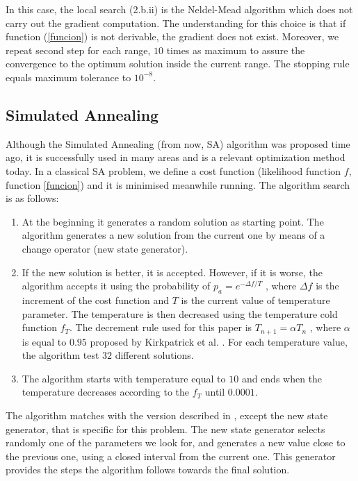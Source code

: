 \documentclass{sig-alternate}
\begin{document}
In this case, the local search (2.b.ii) is the Neldel-Mead algorithm which does not carry out the gradient computation. The understanding for this choice is that if function (\ref{funcion}) is not derivable, the gradient does not exist. Moreover, we repeat second step for each range, $10$ times as maximum to assure the convergence to the optimum solution inside the current range. The stopping rule equals maximum tolerance to $10^{-8}$.





\subsection{Simulated Annealing}
\label{subsec:SA}
Although the Simulated Annealing (from now, SA) \cite{SA} algorithm was proposed time ago, it is successfully used in many areas and is a relevant optimization method today. In a classical SA \cite{SA} problem, we define a cost function (likelihood function $f$, function \ref{funcion}) and it is minimised meanwhile running.  The algorithm search is as follows:

\begin{enumerate}
\item At the beginning it generates a random solution as starting point. The algorithm generates a new solution from the current one by means of a change operator (new state generator).
\item If the new solution is better, it is accepted. However, if it is worse, the algorithm accepts it using the probability of $p_a = e^{ - \Delta f / T }$ , where $\Delta f$  is the increment of the cost function and $T$ is the current value of temperature parameter. The temperature is then decreased using the temperature cold function $f_T$. The decrement rule used for this paper is $T_{n+1} = \alpha T_n$ , where $\alpha$ is equal to $0.95$ proposed by Kirkpatrick et al. \cite{Kirkpatrick83}.  For each temperature value, the algorithm test $32$ different solutions.
\item The algorithm starts with temperature equal to $10$ and ends when the temperature decreases according to the $f_T$ until $0.0001$.
\end{enumerate}

The algorithm matches with the version described in \cite{Michalewicz96}, except the new state generator, that is specific for this problem. The new state generator selects randomly one of the parameters we look for, and generates a new value close to the previous one, using a closed interval from the current one. This generator provides the steps the algorithm follows towards the final solution.
\end{document}
